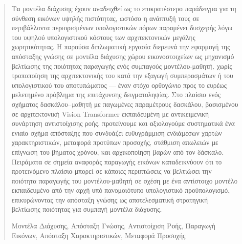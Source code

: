 \begin{abstract}

Τα μοντέλα διάχυσης έχουν αναδειχθεί ως το επικρατέστερο παράδειγμα για τη
σύνθεση εικόνων υψηλής πιστότητας, ωστόσο η ανάπτυξή τους σε περιβάλλοντα
περιορισμένων υπολογιστικών πόρων παραμένει δυσχερής λόγω του υψηλού
υπολογιστικού κόστους των αρχιτεκτονικών μεγάλης χωρητικότητας. Η παρούσα
διπλωματική εργασία διερευνά την εφαρμογή της απόσταξης γνώσης σε μοντέλα
διάχυσης χώρου εικονοστοιχείων ως μηχανισμό βελτίωσης της ποιότητας παραγωγής
ενός συμπαγούς μοντέλου-μαθητή, χωρίς τροποποίηση της αρχιτεκτονικής του κατά
την εξαγωγή συμπερασμάτων ή του υπολογιστικού του αποτυπώματος --- έναν στόχο
ορθογώνιο προς το ευρέως μελετημένο πρόβλημα της επιτάχυνσης δειγματοληψίας.
Στο πλαίσιο ενός σχήματος δασκάλου--μαθητή με παγωμένες παραμέτρους δασκάλου,
βασισμένου σε αρχιτεκτονική Vision Transformer εκπαιδευμένη με αντικειμενική
συνάρτηση αντιστοίχισης ροής, προτείνουμε και αξιολογούμε συστηματικά ένα ενιαίο
σχήμα απόσταξης που συνδυάζει ευθυγράμμιση ενδιάμεσων χαρτών χαρακτηριστικών,
μεταφορά προτύπων προσοχής, στάθμιση απωλειών με επίγνωση του βήματος χρόνου,
και αρχικοποίηση βαρών από τον δάσκαλο. Πειράματα σε σημεία αναφοράς παραγωγής
εικόνων καταδεικνύουν ότι το προτεινόμενο πλαίσιο μπορεί σε κάποιες περιπτώσεις να βελτιώσει την ποιότητα παραγωγής του μοντέλου-μαθητή σε σχέση με ένα αντίστοιχο μοντέλο εκπαιδευμένο από την αρχή υπό πανομοιότυπο υπολογιστικό προϋπολογισμό, επικυρώνοντας την απόσταξη γνώσης ως αποτελεσματική στρατηγική βελτίωσης ποιότητας για συμπαγή
μοντέλα διάχυσης.

   \begin{keywords}
      Μοντέλα Διάχυσης, Απόσταξη Γνώσης, Αντιστοίχιση Ροής,
      Παραγωγή Εικόνων, Απόσταξη Χαρακτηριστικών, Μεταφορά Προσοχής
   \end{keywords}
\end{abstract}



